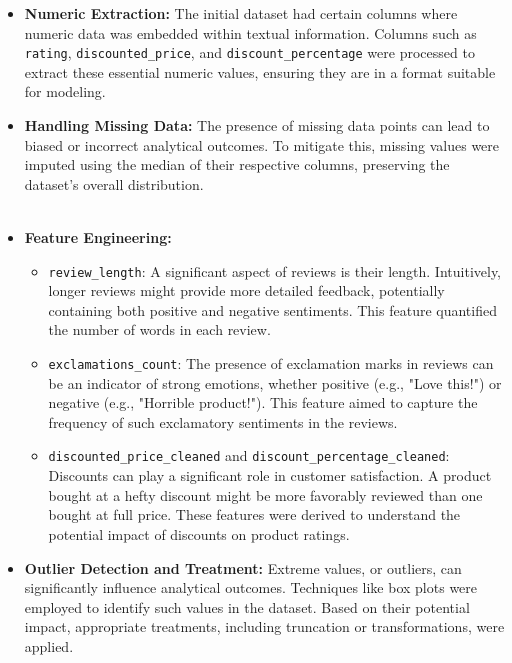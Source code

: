 \documentclass[12pt]{article}
\begin{document}
\begin{itemize}
    \item \textbf{Numeric Extraction:} The initial dataset had certain columns where numeric data was embedded within textual information. Columns such as \texttt{rating}, \texttt{discounted\_price}, and \texttt{discount\_percentage} were processed to extract these essential numeric values, ensuring they are in a format suitable for modeling.
    
    \item \textbf{Handling Missing Data:} The presence of missing data points can lead to biased or incorrect analytical outcomes. To mitigate this, missing values were imputed using the median of their respective columns, preserving the dataset's overall distribution.\\
    \\

    \item \textbf{Feature Engineering:} 
    \begin{itemize}
        \item \texttt{review\_length}: A significant aspect of reviews is their length. Intuitively, longer reviews might provide more detailed feedback, potentially containing both positive and negative sentiments. This feature quantified the number of words in each review.
        
        \item \texttt{exclamations\_count}: The presence of exclamation marks in reviews can be an indicator of strong emotions, whether positive (e.g., "Love this!") or negative (e.g., "Horrible product!"). This feature aimed to capture the frequency of such exclamatory sentiments in the reviews.
        
        \item \texttt{discounted\_price\_cleaned} and \texttt{discount\_percentage\_cleaned}: Discounts can play a significant role in customer satisfaction. A product bought at a hefty discount might be more favorably reviewed than one bought at full price. These features were derived to understand the potential impact of discounts on product ratings.
    \end{itemize}
    
    \item \textbf{Outlier Detection and Treatment:} Extreme values, or outliers, can significantly influence analytical outcomes. Techniques like box plots were employed to identify such values in the dataset. Based on their potential impact, appropriate treatments, including truncation or transformations, were applied.
\end{itemize}
\end{document}
